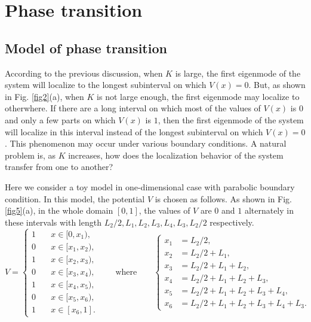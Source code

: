 \documentclass[a4paper,11pt]{article}
\begin{document}
\section{Phase transition}

\subsection{Model of phase transition}

According to the previous discussion, when $K$ is large, the first eigenmode of the system will localize to the longest subinterval on which $V(x) = 0$. But, as shown in Fig. \ref{fig2}(a), when $K$ is not large enough, the first eigenmode may localize to otherwhere. If there are a long interval on which most of the values of $V(x)$ is $0$ and only a few parts on which $V(x)$ is $1$, then the first eigenmode of the system will localize in this interval instead of the longest subinterval on which $V(x) = 0$. This phenomenon may occur under various boundary conditions. A natural problem is, as $K$ increases, how does the localization behavior of the system transfer from one to another?

Here we consider a toy model in one-dimensional case with parabolic boundary condition. In this model, the potential $V$ is chosen as follows. As shown in Fig. \ref{fig5}(a), in the whole domain $[0, 1]$, the values of $V$ are $0$ and $1$ alternately in these intervals with length $L_2/2, L_1, L_2, L_3, L_4, L_3, L_2/2$ respectively.
\begin{equation*}
V = \left\{
\begin{split}
1 & \quad x \in [0, x_1), \\
0 & \quad x \in [x_1, x_2), \\
1 & \quad x \in [x_2, x_3), \\
0 & \quad x \in [x_3, x_4), \\
1 & \quad x \in [x_4, x_5), \\
0 & \quad x \in [x_5, x_6), \\
1 & \quad x \in [x_6, 1].
\end{split}
\right.
\qquad
\text{where}
\qquad
\left\{
\begin{split}
x_1 & = L_2/2, \\
x_2 & = L_2/2 + L_1, \\
x_3 & = L_2/2 + L_1 + L_2, \\
x_4 & = L_2/2 + L_1 + L_2 + L_3, \\
x_5 & = L_2/2 + L_1 + L_2 + L_3 + L_4, \\
x_6 & = L_2/2 + L_1 + L_2 + L_3 + L_4 + L_3.
\end{split}
\right.
\end{equation*}
\end{document}
